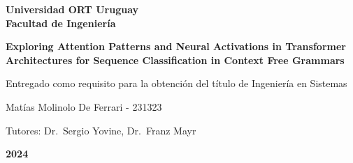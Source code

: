 \begin{center}

\textbf{\fontsize{14pt}{21pt}\selectfont Universidad ORT Uruguay\\Facultad de Ingeniería}

\bigskip\bigskip\bigskip\bigskip


\fontsize{24.88pt}{30pt}\selectfont 
\textbf{Exploring Attention Patterns and Neural Activations in Transformer Architectures for Sequence Classification in Context Free Grammars}


\bigskip\bigskip\bigskip\bigskip


\fontsize{14pt}{21pt}\selectfont Entregado como requisito para la obtención del título de Ingeniería en Sistemas


\bigskip
\bigskip
\bigskip\bigskip\bigskip


\fontsize{14pt}{21pt}\selectfont Matías Molinolo De Ferrari - 231323


\bigskip
\bigskip
\bigskip
\bigskip
\fontsize{14pt}{21pt}\selectfont Tutores: Dr.\ Sergio Yovine, Dr.\ Franz Mayr


\bigskip\bigskip\bigskip\bigskip


\fontsize{20.74pt}{21pt}\selectfont \textbf{2024}


\end{center}
\vspace*{\fill}
